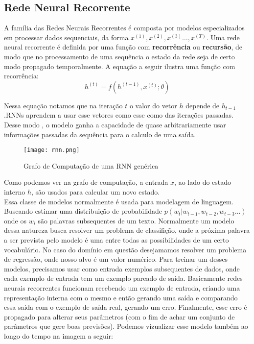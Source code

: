 \subsection{Rede Neural Recorrente}
% 

A família das Redes Neurais Recorrentes é composta por modelos especializados
em processar dados sequenciais, da forma $x^{(1)},x^{(2)} ,x^{(3)}\dots ,x^{(T)}$. Uma rede neural recorrente é definida por uma função com
\textbf{recorrência} ou \textbf{recursão}, de modo que no processamento de uma
sequência o estado da rede seja de certo modo propagado temporalmente. A equação
a seguir ilustra uma função com recorrência: \\

\[h^{(t)} = f(h^{(t-1)},x^{(t)};\theta)\]

Nessa equação notamos que na iteração $t$ o valor do vetor $h$ depende de
$h_{t-1}$.RNNs aprendem a usar esse vetores como esse como
 das iterações passadas. Desse modo , o modelo ganha a capacidade
de quase arbitrariamente usar informações passadas da sequência para o calculo
de uma saída. 

\begin{figure}[H]
\centering
\texttt{[image: rnn.png]}
\caption{Grafo de Computação de uma RNN genérica \citep{dlbook}}
\end{figure}

Como podemos ver na grafo de computação, a entrada $x$, ao lado do estado
interno $h$, são usados para calcular um novo estado. 
\\

Essa classe de modelos normalmente é usada para modelagem de linguagem. Buscando estimar uma distribuição de probabilidade $p(w_t | w_{t-1},w_{t-2},w_{t-3} \dots ) $ onde os $w_i$ são palavras subsequentes de um texto. Normalmente um modelo dessa natureza busca resolver um problema de classifição, onde a próxima palavra a ser prevista pelo modelo é uma entre todas as possibilidades de um certo vocabulário. No caso do domínio em questão desejamamos resolver um problema de regressão, onde nosso alvo é um valor numérico. Para treinar um desses modelos, precisamos usar como entrada exemplos subsequentes de dados, onde cada exemplo de entrada tem um exemplo pareado de saída. Basicamente redes neurais recorrentes funcionam recebendo um exemplo de entrada, criando uma representação interna com o mesmo e então gerando uma saída e comparando essa saída com o exemplo de saída real, gerando um erro. Finalmente, esse erro é propagado para alterar seus parâmetros (com o fim de achar um conjunto de parâmetros que gere boas previsões). Podemos vizualizar esse modelo também ao longo do tempo na imagem a seguir:


